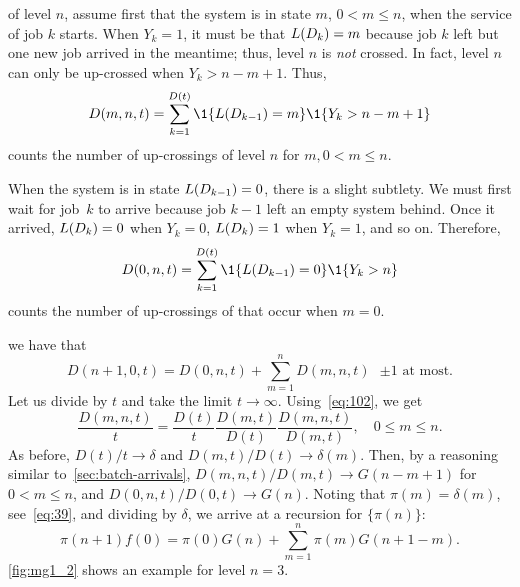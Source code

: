  of level $n$, assume first that the system is in state $m$, $0<m \leq n$, when the service of job $k$ starts.
When $Y_k=1$, it must be that $L(D_k)=m$ because job $k$ left but one new job arrived in the meantime; thus, level $n$ is \emph{not} crossed.
In fact, level $n$ can only be up-crossed when $Y_k > n-m + 1$. Thus,
\begin{equation*}
D(m, n, t)  = \sum_{k=1}^{D(t)}\1{\L(D_{k-1})=m}\1{Y_k > n-m+1}
\end{equation*}
counts the number of up-crossings of level $n$ for $m, 0< m \leq n$.

When the system is in state $L(D_{k-1}) = 0$, there is a slight subtlety.
We must first wait for job~$k$ to arrive
because job $k-1$ left an empty system behind.
Once it arrived, $L(D_k)=0$ when $Y_k=0$, $L(D_k) = 1$ when $Y_k=1$, and so on.
Therefore,
\begin{equation*}
D(0, n, t)  = \sum_{k=1}^{D(t)}\1{\L(D_{k-1})=0}\1{Y_k > n}
\end{equation*}
counts the number of up-crossings of that occur when $m=0$.



 we have that
\begin{equation*}
D(n+1,0, t) =  D(0, n, t) + \sum_{m=1}^n D(m,n, t) \text{ $\pm 1$  at most.}
\end{equation*}
Let us divide by $t$ and take the limit $t\to\infty$.  Using~\cref{eq:102}, we get
\begin{equation*}
  \frac{D(m,n,t)}{t} =
 \frac{D(t)}{t}
\frac{D(m,t)}{D(t)}
  \frac{D(m,n,t)}{D(m,t)}, \quad 0\leq m \leq n.
\end{equation*}
As before, $D(t)/t\to \delta$ and $D(m,t)/D(t)\to \delta(m)$.
Then, by a reasoning similar to~\cref{sec:batch-arrivals}, $D(m,n,t)/D(m,t) \to G(n-m+1)$ for $0<m\leq n$, and $D(0,n,t)/D(0,t) \to G(n)$.
Noting that $\pi(m) = \delta(m)$, see~\cref{eq:39}, and dividing by $\delta$,  we arrive at  a recursion for $\{\pi(n)\}$:
\begin{equation}\label{eq:72}
 \pi(n+1) f(0)= \pi(0) G(n) + \sum_{m=1}^{n} \pi(m) G(n+1-m).
\end{equation}
\cref{fig:mg1_2} shows an example for level $n=3$.

